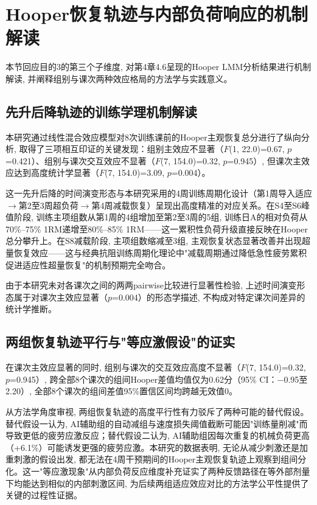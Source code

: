 \section{Hooper恢复轨迹与内部负荷响应的机制解读}
\label{sec:hooper_discussion}

本节回应目的3的第三个子维度, 对第4章4.6呈现的Hooper LMM分析结果进行机制解读, 并阐释组别与课次两种效应格局的方法学与实践意义。

\subsection{先升后降轨迹的训练学理机制解读}
\label{sec:up_down_trajectory}

本研究通过线性混合效应模型对8次训练课前的Hooper主观恢复总分进行了纵向分析, 取得了三项相互印证的关键发现：组别主效应不显著（$F$(1, 22.0)=0.67, $p$=0.421）、组别与课次交互效应不显著（$F$(7, 154.0)=0.32, $p$=0.945）, 但课次主效应达到高度统计学显著（$F$(7, 154.0)=3.09, $p$=0.004）。

这一先升后降的时间演变形态与本研究采用的4周训练周期化设计（第1周导入适应$\to$第2至3周超负荷$\to$第4周减载恢复）呈现出高度精准的对应关系。在S4至S6峰值阶段, 训练主项组数从第1周的4组增加至第2至3周的5组, 训练日A的相对负荷从70\%--75\% 1RM递增至80\%--85\% 1RM——这一累积性负荷升级直接反映在Hooper总分攀升上。在S8减载阶段, 主项组数缩减至3组, 主观恢复状态显著改善并出现超量恢复效应——这与经典抗阻训练周期化理论中"减载周期通过降低急性疲劳累积促进适应性超量恢复"的机制预期完全吻合。

由于本研究未对各课次之间的两两pairwise比较进行显著性检验, 上述时间演变形态属于对课次主效应显著（$p$=0.004）的形态学描述, 不构成对特定课次间差异的统计学推断。

\subsection{两组恢复轨迹平行与"等应激假设"的证实}
\label{sec:equal_stress}

在课次主效应显著的同时, 组别与课次的交互效应高度不显著（$F$(7, 154.0)=0.32, $p$=0.945）, 跨全部8个课次的组间Hooper差值均值仅为0.62分（95\% CI：$-$0.95至2.20）, 全部8个课次的组间差值95\%置信区间均跨越无效值0。

从方法学角度审视, 两组恢复轨迹的高度平行性有力驳斥了两种可能的替代假设。替代假设一认为, AI辅助组的自动减组与速度损失阈值截断可能因"训练量削减"而导致更低的疲劳应激反应；替代假设二认为, AI辅助组因每次重复的机械负荷更高（+6.1\%）可能诱发更强的疲劳应激。本研究的数据表明, 无论从减少刺激还是加重刺激的假设出发, 都无法在4周干预期间的Hooper主观恢复轨迹上观察到组间分化。这一"等应激现象"从内部负荷反应维度补充证实了两种反馈路径在等外部剂量下均能达到相似的内部刺激区间, 为后续两组适应效应对比的方法学公平性提供了关键的过程性证据。

